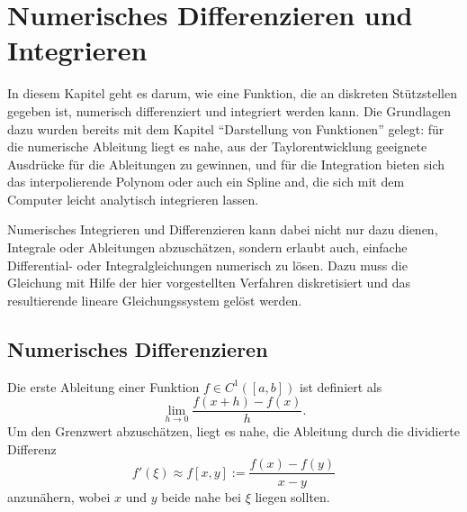 % 

\chapter{Numerisches Differenzieren und Integrieren}

In diesem Kapitel geht es darum, wie eine Funktion, die an diskreten
Stützstellen gegeben ist, numerisch differenziert und integriert
werden kann. Die Grundlagen dazu wurden bereits mit dem Kapitel
``Darstellung von Funktionen'' gelegt: für die numerische Ableitung
liegt es nahe, aus der Taylorentwicklung geeignete Ausdrücke für die
Ableitungen zu gewinnen, und für die Integration bieten sich das
interpolierende Polynom oder auch ein Spline and, die sich mit dem
Computer leicht analytisch integrieren lassen.

Numerisches Integrieren und Differenzieren kann dabei nicht nur dazu
dienen, Integrale oder Ableitungen abzuschätzen, sondern erlaubt auch,
einfache Differential- oder Integralgleichungen numerisch zu
lösen. Dazu muss die Gleichung mit Hilfe der hier vorgestellten
Verfahren diskretisiert und das resultierende lineare Gleichungssystem
gelöst werden.

\section{Numerisches Differenzieren}

Die erste Ableitung einer Funktion $f\in C^1([a,b])$ ist definiert als
\begin{equation}
  \lim_{h\to 0} \frac{f(x+h) - f(x)}{h}.
\end{equation}
Um den Grenzwert abzuschätzen, liegt es nahe, die Ableitung durch die
dividierte Differenz
\begin{equation}
  f'(\xi) \approx f[x,y] := \frac{f(x) - f(y)}{x - y}
\end{equation}
anzunähern, wobei $x$ und $y$ beide nahe bei $\xi$ liegen sollten.

